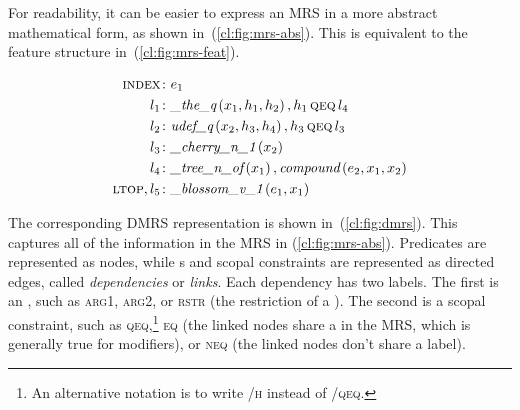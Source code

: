 \documentclass[output=paper
                ,modfonts
                ,nonflat
	        ,collection
	        ,collectionchapter
	        ,collectiontoclongg
 	        ,biblatex
                ,babelshorthands
                ,newtxmath
                ,draftmode
                ,colorlinks, citecolor=brown
]{./langsci/langscibook}
\begin{document}
For readability, it can be easier to express an MRS
in a more abstract mathematical form, as shown in~(\ref{cl:fig:mrs-abs}).
This is equivalent to the feature structure in~(\ref{cl:fig:mrs-feat}).

\begin{exe}
	\setlength{\abovedisplayskip}{1ex}
	\setlength{\belowdisplayskip}{1ex}
	\ex\label{cl:fig:mrs-abs}
	\begin{minipage}[c]{.6\textwidth}
	\vspace*{-1\baselineskip}
	\begin{align*}
	    \textsc{index}\colon & e_1 \\
		l_1\colon & \textit{\_the\_q}\left(x_1,h_1,h_2\right), h_1 \,\textsc{qeq}\, l_4 \\
		l_2\colon & \textit{udef\_q}\left(x_2,h_3,h_4\right), h_3 \,\textsc{qeq}\, l_3 \\
		l_3\colon & \textit{\_cherry\_n\_1}\left(x_2\right) \\
		l_4\colon & \textit{\_tree\_n\_of}\left(x_1\right), \textit{compound}\left(e_2,x_1,x_2\right) \\
		\textsc{ltop}, l_5\colon & \textit{\_blossom\_v\_1}\left(e_1,x_1\right)
	\end{align*}
	\end{minipage}
\end{exe}

The corresponding DMRS
representation is shown in~(\ref{cl:fig:dmrs}).
This captures all of the information
in the MRS in (\ref{cl:fig:mrs-abs}).
Predicates are represented as nodes,
while s and scopal constraints are represented as directed edges,
called \textit{dependencies} or \textit{links}.
Each dependency has two labels.
The first is an ,
such as \textsc{arg1}, \textsc{arg2},
or \textsc{rstr} (the restriction of a ).
The second is a scopal constraint,
such as \textsc{qeq},\footnote{%
	An alternative notation is to write
	\textsc{/h} instead of \textsc{/qeq}.
}
\textsc{eq} (the linked nodes share a  in the MRS,
which is generally true for modifiers),
or \textsc{neq} (the linked nodes don't share a label).
\end{document}
